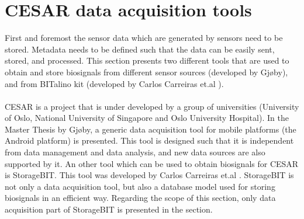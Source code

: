 \section{CESAR data acquisition tools}
    First and foremost the sensor data which are generated by sensors need to be stored. Metadata needs to be defined such that the data can be easily sent, stored, and processed. This section presents two different tools that are used to obtain and store biosignals from different sensor sources (developed by Gjøby\cite{SP}), and from BITalino kit (developed by Carlos Carreiras et.al \cite{StorageBIT}).\\\\
    CESAR is a project that is under developed by a group of universities (University of Oslo, National University of Singapore and Oslo University Hospital). In the Master Thesis by Gjøby\cite{SP}, a generic data acquisition tool for mobile platforms (the Android platform) is presented. This tool is designed such that it is independent from data management and data analysis, and new data sources are also supported by it. An other tool which can be used to obtain biosignals for CESAR is StorageBIT. This tool was developed by Carlos Carreiras et.al \cite{StorageBIT}. StorageBIT is not only a data acquisition tool, but also a database model used for storing biosignals in an efficient way. Regarding the scope of this section, only data acquisition part of StorageBIT is presented in the section.
